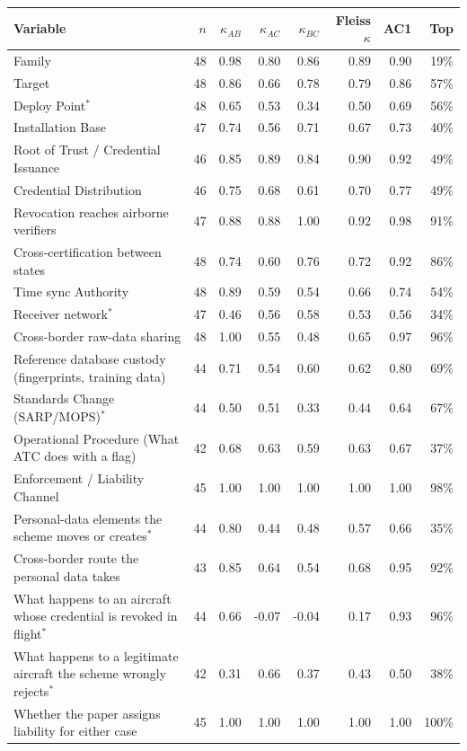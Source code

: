 \begin{tabular}{@{}lrrrrrrr@{}}
\toprule
Variable & $n$ & $\kappa_{AB}$ & $\kappa_{AC}$ & $\kappa_{BC}$ & Fleiss $\kappa$ & AC1 & Top \\
\midrule
Family & 48 & 0.98 & 0.80 & 0.86 & 0.89 & 0.90 & 19\% \\
Target & 48 & 0.86 & 0.66 & 0.78 & 0.79 & 0.86 & 57\% \\
Deploy Point$^{*}$ & 48 & 0.65 & 0.53 & 0.34 & 0.50 & 0.69 & 56\% \\
Installation Base & 47 & 0.74 & 0.56 & 0.71 & 0.67 & 0.73 & 40\% \\
Root of Trust / Credential Issuance & 46 & 0.85 & 0.89 & 0.84 & 0.90 & 0.92 & 49\% \\
Credential Distribution & 46 & 0.75 & 0.68 & 0.61 & 0.70 & 0.77 & 49\% \\
Revocation reaches airborne verifiers & 47 & 0.88 & 0.88 & 1.00 & 0.92 & 0.98 & 91\% \\
Cross-certification between states & 48 & 0.74 & 0.60 & 0.76 & 0.72 & 0.92 & 86\% \\
Time sync Authority & 48 & 0.89 & 0.59 & 0.54 & 0.66 & 0.74 & 54\% \\
Receiver network$^{*}$ & 47 & 0.46 & 0.56 & 0.58 & 0.53 & 0.56 & 34\% \\
Cross-border raw-data sharing & 48 & 1.00 & 0.55 & 0.48 & 0.65 & 0.97 & 96\% \\
Reference database custody (fingerprints, training data) & 44 & 0.71 & 0.54 & 0.60 & 0.62 & 0.80 & 69\% \\
Standards Change (SARP/MOPS)$^{*}$ & 44 & 0.50 & 0.51 & 0.33 & 0.44 & 0.64 & 67\% \\
Operational Procedure (What ATC does with a flag) & 42 & 0.68 & 0.63 & 0.59 & 0.63 & 0.67 & 37\% \\
Enforcement / Liability Channel & 45 & 1.00 & 1.00 & 1.00 & 1.00 & 1.00 & 98\% \\
Personal-data elements the scheme moves or creates$^{*}$ & 44 & 0.80 & 0.44 & 0.48 & 0.57 & 0.66 & 35\% \\
Cross-border route the personal data takes & 43 & 0.85 & 0.64 & 0.54 & 0.68 & 0.95 & 92\% \\
What happens to an aircraft whose credential is revoked in flight$^{*}$ & 44 & 0.66 & -0.07 & -0.04 & 0.17 & 0.93 & 96\% \\
What happens to a legitimate aircraft the scheme wrongly rejects$^{*}$ & 42 & 0.31 & 0.66 & 0.37 & 0.43 & 0.50 & 38\% \\
Whether the paper assigns liability for either case & 45 & 1.00 & 1.00 & 1.00 & 1.00 & 1.00 & 100\% \\
\bottomrule
\end{tabular}
